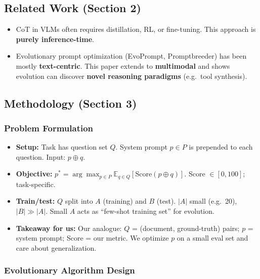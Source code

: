 \documentclass[11pt,a4paper]{article}
\begin{document}
\subsection{Related Work (Section 2)}

\begin{itemize}
  \item CoT in VLMs often requires distillation, RL, or fine-tuning. This approach is \textbf{purely inference-time}.
  \item Evolutionary prompt optimization (EvoPrompt, Promptbreeder) has been mostly \textbf{text-centric}. This paper extends to \textbf{multimodal} and shows evolution can discover \textbf{novel reasoning paradigms} (e.g.\ tool synthesis).
\end{itemize}

\subsection{Methodology (Section 3)}

\subsubsection{Problem Formulation}

\begin{itemize}
  \item \textbf{Setup:} Task has question set $Q$. System prompt $p \in P$ is prepended to each question. Input: $p \oplus q$.
  \item \textbf{Objective:} $p^* = \arg\max_{p \in P} \mathbb{E}_{q \in Q}[\mathrm{Score}(p \oplus q)]$. Score $\in [0, 100]$; task-specific.
  \item \textbf{Train/test:} $Q$ split into $A$ (training) and $B$ (test). $|A|$ small (e.g.\ 20), $|B| \gg |A|$. Small $A$ acts as ``few-shot training set'' for evolution.
  \item \textbf{Takeaway for us:} Our analogue: $Q$ = (document, ground-truth) pairs; $p$ = system prompt; Score = our metric. We optimize $p$ on a small eval set and care about generalization.
\end{itemize}

\subsubsection{Evolutionary Algorithm Design}
\end{document}
